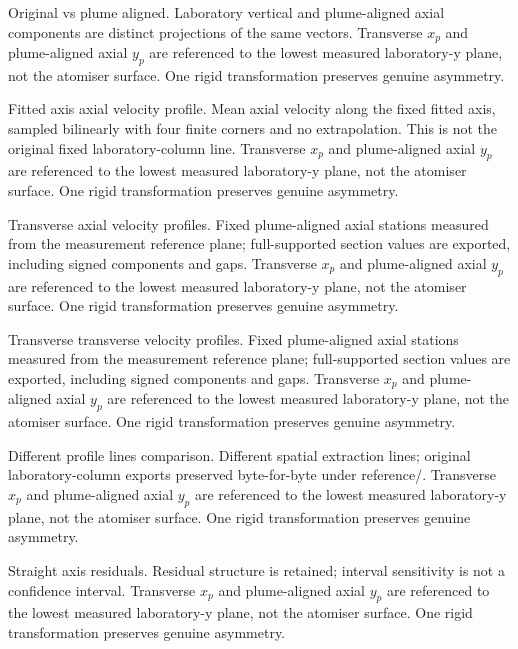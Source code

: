 \caption{Original vs plume aligned. Laboratory vertical and plume-aligned axial components are distinct projections of the same vectors. Transverse $x_p$ and plume-aligned axial $y_p$ are referenced to the lowest measured laboratory-y plane, not the atomiser surface. One rigid transformation preserves genuine asymmetry.}

\caption{Fitted axis axial velocity profile. Mean axial velocity along the fixed fitted axis, sampled bilinearly with four finite corners and no extrapolation. This is not the original fixed laboratory-column line. Transverse $x_p$ and plume-aligned axial $y_p$ are referenced to the lowest measured laboratory-y plane, not the atomiser surface. One rigid transformation preserves genuine asymmetry.}

\caption{Transverse axial velocity profiles. Fixed plume-aligned axial stations measured from the measurement reference plane; full-supported section values are exported, including signed components and gaps. Transverse $x_p$ and plume-aligned axial $y_p$ are referenced to the lowest measured laboratory-y plane, not the atomiser surface. One rigid transformation preserves genuine asymmetry.}

\caption{Transverse transverse velocity profiles. Fixed plume-aligned axial stations measured from the measurement reference plane; full-supported section values are exported, including signed components and gaps. Transverse $x_p$ and plume-aligned axial $y_p$ are referenced to the lowest measured laboratory-y plane, not the atomiser surface. One rigid transformation preserves genuine asymmetry.}

\caption{Different profile lines comparison. Different spatial extraction lines; original laboratory-column exports preserved byte-for-byte under reference/. Transverse $x_p$ and plume-aligned axial $y_p$ are referenced to the lowest measured laboratory-y plane, not the atomiser surface. One rigid transformation preserves genuine asymmetry.}

\caption{Straight axis residuals. Residual structure is retained; interval sensitivity is not a confidence interval. Transverse $x_p$ and plume-aligned axial $y_p$ are referenced to the lowest measured laboratory-y plane, not the atomiser surface. One rigid transformation preserves genuine asymmetry.}

